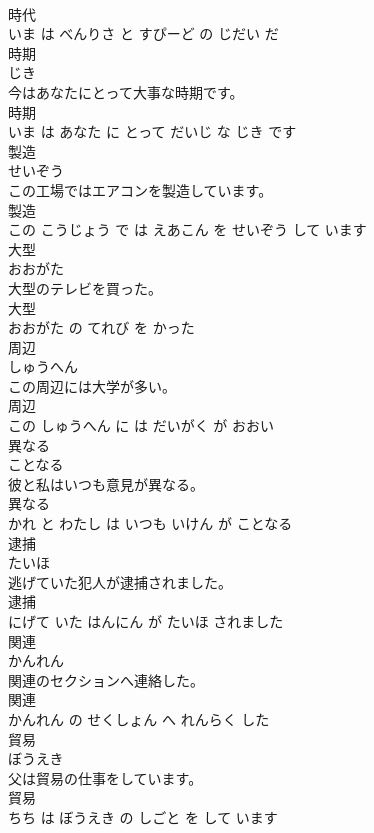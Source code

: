 \documentclass[8pt]{extreport}
\begin{document}
\begin{CJK}{UTF8}{min}
\\	時代 
\\	いま は べんりさ と すぴーど の じだい だ			
\\	時期	
\\	じき			
\\	今はあなたにとって大事な時期です。	
\\	時期 
\\	いま は あなた に とって だいじ な じき です			
\\	製造	
\\	せいぞう			
\\	この工場ではエアコンを製造しています。	
\\	製造 
\\	この こうじょう で は えあこん を せいぞう して います			
\\	大型	
\\	おおがた			
\\	大型のテレビを買った。	
\\	大型 
\\	おおがた の てれび を かった			
\\	周辺	
\\	しゅうへん			
\\	この周辺には大学が多い。	
\\	周辺 
\\	この しゅうへん に は だいがく が おおい			
\\	異なる	
\\	ことなる			
\\	彼と私はいつも意見が異なる。	
\\	異なる 
\\	かれ と わたし は いつも いけん が ことなる			
\\	逮捕	
\\	たいほ			
\\	逃げていた犯人が逮捕されました。	
\\	逮捕 
\\	にげて いた はんにん が たいほ されました			
\\	関連	
\\	かんれん			
\\	関連のセクションへ連絡した。	
\\	関連 
\\	かんれん の せくしょん へ れんらく した			
\\	貿易	
\\	ぼうえき			
\\	父は貿易の仕事をしています。	
\\	貿易 
\\	ちち は ぼうえき の しごと を して います			

\end{CJK}
\end{document}
